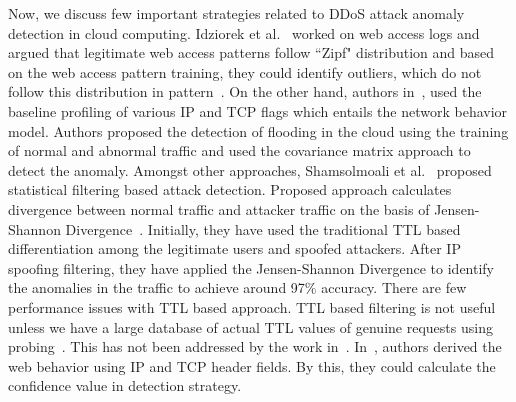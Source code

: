 \documentclass[final,5p,times,twocolumn]{elsarticle}
\begin{document}
Now, we discuss few important strategies related to DDoS attack anomaly detection in cloud computing. Idziorek et al.~\cite{idziorekdetecting} worked on web access logs and argued that legitimate web access patterns follow ``Zipf" distribution and based on the web access pattern training, they could identify outliers, which do not follow this distribution in pattern~\cite{idziorekdetecting}. On the other hand, authors in~\cite{covariance}, used the baseline profiling of various IP and TCP flags which entails the network behavior model. Authors proposed the detection of flooding in the cloud using the training of normal and abnormal traffic and used the covariance matrix approach to detect the anomaly. Amongst other approaches, Shamsolmoali et al.~\cite{shamsolmoali2014statistical} proposed statistical filtering based attack detection. Proposed approach calculates divergence between normal traffic and attacker traffic on the basis of Jensen-Shannon Divergence~\cite{gomez2000analysis}. Initially, they have used the traditional TTL based differentiation among the legitimate users and spoofed attackers. After IP spoofing filtering, they have applied the Jensen-Shannon Divergence to identify the anomalies in the traffic to achieve around 97\% accuracy. There are few performance issues with TTL based approach. TTL based filtering is not useful unless we have a large database of actual TTL values of genuine requests using probing~\cite{templeton2003detecting}. This has not been addressed by the work in~\cite{shamsolmoali2014statistical}. In~\cite{cbf}, authors derived the web behavior using IP and TCP header fields. By this, they could calculate the confidence value in detection strategy. 
\end{document}
